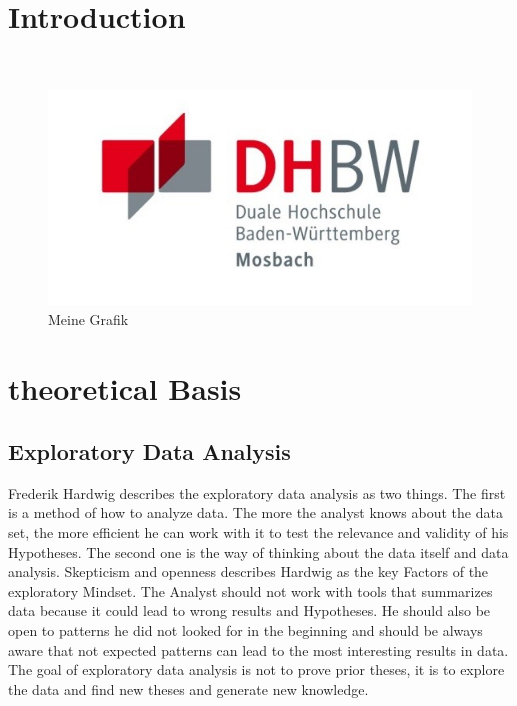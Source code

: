 \chapter{Introduction} 
    \autocite[vgl.][S.1]{01} \\
    \begin{figure}[h]
        \centering
        \includegraphics{images/dhbw-logo.jpg}
        \caption{Meine Grafik}
        \label{fig:meine-grafik}
    \end{figure}
       

\chapter{theoretical Basis}

    \section{Exploratory Data Analysis} 
	
	
	\noindent Frederik Hardwig describes the exploratory data analysis as two things. The first is a method of how to analyze data. The more the analyst knows about the data set, the more efficient he can work with it to test the relevance and validity of his Hypotheses. The second one is the way of thinking about the data itself and data analysis. Skepticism and openness describes Hardwig as the key Factors of the exploratory Mindset. The Analyst should not work with tools that summarizes data because it could lead to wrong results and Hypotheses. He should also be open to patterns he did not looked for in the beginning and should be always aware that not expected patterns can lead to the most interesting results in data. The goal of exploratory data analysis is not to prove prior theses, it is to explore the data and find new theses and generate new knowledge.
	

